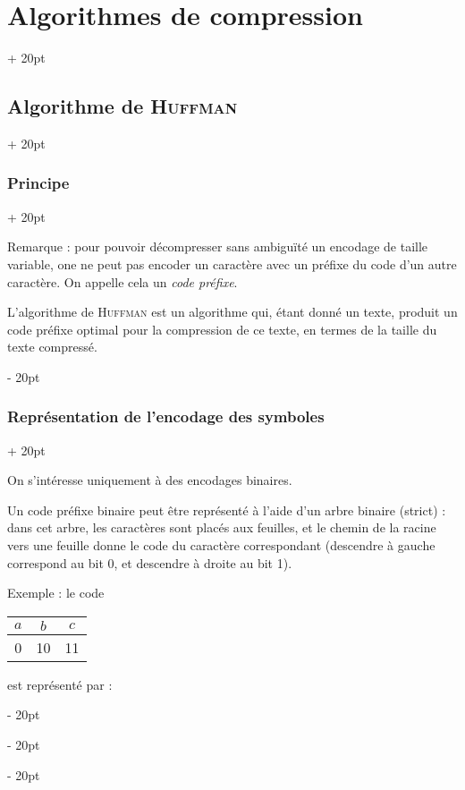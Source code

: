 \documentclass[a4paper, 12pt, twoside]{article}
\newcommand{\ind}[1][20pt]{\advance\leftskip + #1}
\newcommand{\deind}[1][20pt]{\advance\leftskip - #1}
\newenvironment{indt}[2][20pt]{#2 \par \ind[#1]}{\par \deind} %
\begin{document}
\begin{indt}{\section{Algorithmes de compression}}
\begin{indt}{\subsection{Algorithme de \textsc{Huffman}}}
\begin{indt}{\subsubsection{Principe}}
                \vspace{6pt}
                
                Remarque : pour pouvoir décompresser sans ambiguïté un encodage de taille variable, one ne peut pas encoder un caractère avec un préfixe du code d'un autre caractère. On appelle cela un \textit{code préfixe}.

                L'algorithme de \textsc{Huffman} est un algorithme qui, étant donné un texte, produit un code préfixe optimal pour la compression de ce texte, en termes de la taille du texte compressé.
            \end{indt}

            \vspace{12pt}
            
            \begin{indt}{\subsubsection{Représentation de l'encodage des symboles}}
                \label{2.2.2}

                On s'intéresse uniquement à des encodages binaires.
                
                Un code préfixe binaire peut être représenté à l'aide d'un arbre binaire (strict) : dans cet arbre, les caractères sont placés aux feuilles, et le chemin de la racine vers une feuille donne le code du caractère correspondant (descendre à gauche correspond au bit 0, et descendre à droite au bit 1).

                \vspace{12pt}
                
                Exemple : le code
                \begin{tabular}{|c|c|c|}
                    \hline
                    $a$ & $b$ & $c$
                    \\
                    \hline
                    0 & 10 & 11
                    \\
                    \hline
                \end{tabular}
                est représenté par :

                \begin{center}
                \end{center}


\end{indt}
\end{indt}
\end{indt}
\end{document}

